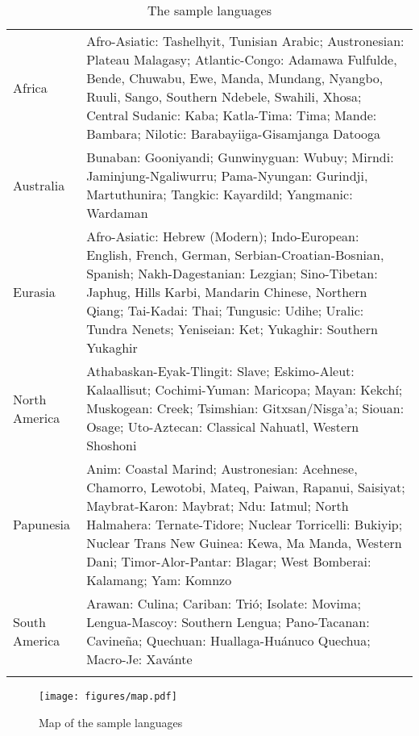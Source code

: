 \begin{table}
\caption{The sample languages \label{tableSample}}\small
\begin{tabularx}{\textwidth}{lQ}
\lsptoprule
Africa & Afro-Asiatic: Tashelhyit, Tunisian Arabic; Austronesian: Plateau Malagasy; Atlantic-Congo: Adamawa Fulfulde, Bende, Chuwabu, Ewe, Manda, Mundang, Nyangbo, Ruuli, Sango, Southern Ndebele, Swahili, Xhosa; Central Sudanic: Kaba; Katla-Tima: Tima; Mande:  Bambara; Nilotic: Barabayiiga-Gisamjanga Datooga\\

Australia & Bunaban:  Gooniyandi; Gunwinyguan: Wubuy; Mirndi: Jaminjung-Ngaliwurru; Pama-Nyungan: Gurindji, Martuthunira; Tangkic:  Kayardild; Yangmanic: Wardaman\\

Eurasia &  Afro-Asiatic: Hebrew (Modern); Indo-European: English, French, German, Serbian\hyp Croatian\hyp Bosnian, Spanish; Nakh-Dagestanian: Lezgian; Sino-Tibetan: Japhug, Hills Karbi, Mandarin Chinese, Northern Qiang; Tai-Kadai: Thai; Tungusic:  Udihe; Uralic: Tundra Nenets; Yeniseian: Ket; Yukaghir: Southern Yukaghir\\

North America & Athabaskan-Eyak-Tlingit: Slave; Eskimo-Aleut: Kalaallisut; Cochimi-Yuman: Maricopa; Mayan: Kekchí; Muskogean: Creek; Tsimshian: Gitxsan/Nisga'a; Siouan: Osage; Uto-Aztecan: Classical Nahuatl, Western Shoshoni\\

Papunesia & Anim: Coastal Marind; Austronesian: Acehnese, Chamorro, Lewotobi, Mateq, Paiwan, Rapanui, Saisiyat; Maybrat-Karon: Maybrat; Ndu: Iatmul; North Halmahera: Ternate-Tidore; Nuclear Torricelli: Bukiyip; Nuclear  Trans New Guinea: Kewa, Ma Manda, Western Dani; Timor-Alor-Pantar: Blagar; West Bomberai: Kalamang; Yam: Komnzo\\

South America & Arawan: Culina; Cariban: Trió; Isolate: Movima; Lengua-Mascoy: Southern Lengua; Pano-Tacanan: Cavineña; Quechuan: Huallaga-Huánuco Quechua; Macro-Je: Xavánte\\
	\lspbottomrule

\end{tabularx}
\end{table}

\begin{figure}
	\texttt{[image: figures/map.pdf]}
	\caption{Map of the sample languages}
	\label{figureMap}
\end{figure}

